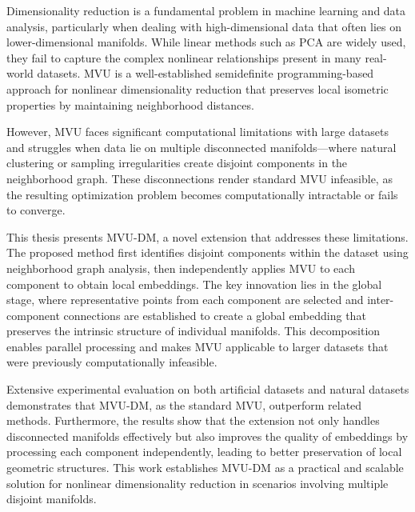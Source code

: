 \acresetall

\noindent Dimensionality reduction is a fundamental problem in machine learning and data analysis, particularly when dealing with high-dimensional data that often lies on lower-dimensional manifolds. While linear methods such as \ac{PCA} are widely used, they fail to capture the complex nonlinear relationships present in many real-world datasets. \ac{MVU} is a well-established semidefinite programming-based approach for nonlinear dimensionality reduction that preserves local isometric properties by maintaining neighborhood distances.

\noindent However, \ac{MVU} faces significant computational limitations with large datasets and struggles when data lie on multiple disconnected manifolds—where natural clustering or sampling irregularities create disjoint components in the neighborhood graph. These disconnections render standard \ac{MVU} infeasible, as the resulting optimization problem becomes computationally intractable or fails to converge.

\noindent This thesis presents \ac{MVU-DM}, a novel extension that addresses these limitations. The proposed method first identifies disjoint components within the dataset using neighborhood graph analysis, then independently applies \ac{MVU} to each component to obtain local embeddings. The key innovation lies in the global stage, where representative points from each component are selected and inter-component connections are established to create a global embedding that preserves the intrinsic structure of individual manifolds. This decomposition enables parallel processing and makes \ac{MVU} applicable to larger datasets that were previously computationally infeasible.

\noindent Extensive experimental evaluation on both artificial datasets and natural datasets demonstrates that \ac{MVU-DM}, as the standard \ac{MVU}, outperform related methods. Furthermore, the results show that the extension not only handles disconnected manifolds effectively but also improves the quality of embeddings by processing each component independently, leading to better preservation of local geometric structures. This work establishes \ac{MVU-DM} as a practical and scalable solution for nonlinear dimensionality reduction in scenarios involving multiple disjoint manifolds.